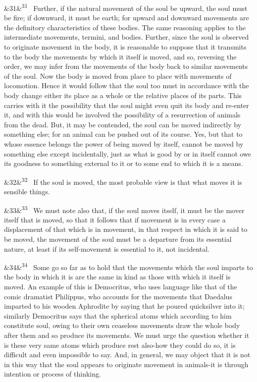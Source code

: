 \documentclass[12pt]{article}
\newcommand{\para}[1][]{\par\noindent\ifx&#1&\else\textsuperscript{\footnotesize #1}~\fi}
\begin{document}
\para[31] Further, if the natural movement of the soul be upward, the soul must be fire; if downward, it must be earth; for upward and downward movements are the definitory characteristics of these bodies. The same reasoning applies to the intermediate movements, termini, and bodies. Further, since the soul is observed to originate movement in the body, it is reasonable to suppose that it transmits to the body the movements by which it itself is moved, and so, reversing the order, we may infer from the movements of the body back to similar movements of the soul. Now the body is moved from place to place with movements of locomotion. Hence it would follow that the soul too must in accordance with the body change either its place as a whole or the relative places of its parts. This carries with it the possibility that the soul might even quit its body and re-enter it, and with this would be involved the possibility of a resurrection of animals from the dead. But, it may be contended, the soul can be moved indirectly by something else; for an animal can be pushed out of its course. Yes, but that to whose essence belongs the power of being moved by itself, cannot be moved by something else except incidentally, just as what is good by or in itself cannot owe its goodness to something external to it or to some end to which it is a means.

\para[32] If the soul is moved, the most probable view is that what moves it is sensible things.

\para[33] We must note also that, if the soul moves itself, it must be the mover itself that is moved, so that it follows that if movement is in every case a displacement of that which is in movement, in that respect in which it is said to be moved, the movement of the soul must be a departure from its essential nature, at least if its self-movement is essential to it, not incidental.

\para[34] Some go so far as to hold that the movements which the soul imparts to the body in which it is are the same in kind as those with which it itself is moved. An example of this is Democritus, who uses language like that of the comic dramatist Philippus, who accounts for the movements that Daedalus imparted to his wooden Aphrodite by saying that he poured quicksilver into it; similarly Democritus says that the spherical atoms which according to him constitute soul, owing to their own ceaseless movements draw the whole body after them and so produce its movements. We must urge the question whether it is these very same atoms which produce rest also-how they could do so, it is difficult and even impossible to say. And, in general, we may object that it is not in this way that the soul appears to originate movement in animals-it is through intention or process of thinking.
\end{document}

